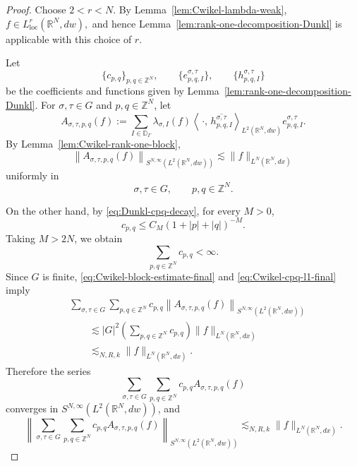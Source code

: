 \documentclass[12pt]{amsart}
\begin{document}
\begin{proof}
Choose
$
2<r<N.
$
By Lemma~\ref{lem:Cwikel-lambda-weak},
$
f\in L^r_{\mathrm{loc}}(\mathbb R^N,dw),
$
and hence Lemma~\ref{lem:rank-one-decomposition-Dunkl} is applicable
with this choice of $r$.

Let
\[
\{c_{p,q}\}_{p,q\in\mathbb Z^N},
\qquad
\{e_{p,q,I}^{\sigma,\tau}\},
\qquad
\{h_{p,q,I}^{\sigma,\tau}\}
\]
be the coefficients and functions given by
Lemma~\ref{lem:rank-one-decomposition-Dunkl}. For
$\sigma,\tau\in G$ and $p,q\in\mathbb Z^N$, let
\[
A_{\sigma,\tau,p,q}(f)
:=
\sum_{I\in\mathbb D_\Gamma}
\lambda_{\sigma,I}(f)
\left\langle
\,\cdot,\,
\overline{h_{p,q,I}^{\sigma,\tau}}
\right\rangle_{L^2(\mathbb R^N,dw)}
e_{p,q,I}^{\sigma,\tau}.
\]
By Lemma~\ref{lem:Cwikel-rank-one-block},
\begin{equation}\label{eq:Cwikel-block-estimate-final}
\left\|
A_{\sigma,\tau,p,q}(f)
\right\|_
{S^{N,\infty}(L^2(\mathbb R^N,dw))}
\lesssim
\|f\|_{L^N(\mathbb R^N,dx)}
\end{equation}
uniformly in
\[
\sigma,\tau\in G,
\qquad
p,q\in\mathbb Z^N.
\]

On the other hand, by \eqref{eq:Dunkl-cpq-decay}, for every $M>0$,
\[
c_{p,q}
\leq
C_M(1+|p|+|q|)^{-M}.
\]
Taking $M>2N$, we obtain
\begin{equation}\label{eq:Cwikel-cpq-l1-final}
\sum_{p,q\in\mathbb Z^N}c_{p,q}<\infty.
\end{equation}
Since $G$ is finite, \eqref{eq:Cwikel-block-estimate-final} and
\eqref{eq:Cwikel-cpq-l1-final} imply
\begin{align*}
&\sum_{\sigma,\tau\in G}
\sum_{p,q\in\mathbb Z^N}
c_{p,q}
\left\|
A_{\sigma,\tau,p,q}(f)
\right\|_
{S^{N,\infty}(L^2(\mathbb R^N,dw))}
\\
&\qquad\lesssim
|G|^2
\left(
\sum_{p,q\in\mathbb Z^N}c_{p,q}
\right)
\|f\|_{L^N(\mathbb R^N,dx)}
\\
&\qquad\lesssim_{N,R,k}
\|f\|_{L^N(\mathbb R^N,dx)}.
\end{align*}
Therefore the series
\[
\sum_{\sigma,\tau\in G}
\sum_{p,q\in\mathbb Z^N}
c_{p,q}A_{\sigma,\tau,p,q}(f)
\]
converges in
$S^{N,\infty}(L^2(\mathbb R^N,dw))$, and
\begin{equation}\label{eq:Cwikel-summed-blocks}
\left\|
\sum_{\sigma,\tau\in G}
\sum_{p,q\in\mathbb Z^N}
c_{p,q}A_{\sigma,\tau,p,q}(f)
\right\|_
{S^{N,\infty}(L^2(\mathbb R^N,dw))}
\lesssim_{N,R,k}
\|f\|_{L^N(\mathbb R^N,dx)}.
\end{equation}


\end{proof}
\end{document}
